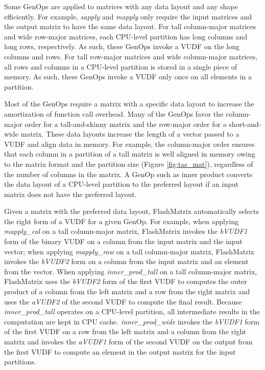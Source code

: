 Some GenOps are applied to matrices with any data layout and any shape
efficiently. For example, \textit{sapply} and \textit{mapply} only require
the input matrices and the output matrix to have the same data layout. For tall
column-major matrices and wide row-major matrices, each CPU-level partition has
long columns and long rows, respectively. As such, these GenOps invoke a VUDF
on the long columns and rows. For tall row-major matrices and wide column-major
matrices, all rows and columns in a CPU-level partition is stored in a single
piece of memory. As such, these GenOps invoke a VUDF only once on all
elements in a partition. %

Most of the GenOps require a matrix with
a specific data layout to increase the amortization of function call overhead.
Many of the GenOps favor the column-major order for a tall-and-skinny matrix
and the row-major order for a short-and-wide matrix. These data layouts increase
the length of a vector passed to a VUDF and align data in memory. For example,
the column-major order ensures that each column in a partition of a tall matrix
is well aligned in memory owing to the matrix format and the partition size
(Figure \ref{fig:tas_mat}), regardless of the number of columns in the matrix.
A GenOp
such as inner product converts the data layout of a CPU-level partition to
the preferred layout if an input matrix does not have the preferred layout.

Given a matrix with the preferred data layout, FlashMatrix automatically
selects the right form of a VUDF for a given GenOp. For example, when applying
\textit{mapply\_col} on a tall column-major matrix, FlashMatrix invokes
the \textit{bVUDF1} form of the binary VUDF on a column from the input matrix
and the input vector; when applying \textit{mapply\_row} on a tall column-major
matrix, FlashMatrix invokes the \textit{bVUDF2} form on a column from the input
matrix and an element from the vector. When applying \textit{inner\_prod\_tall}
on a tall column-major matrix, FlashMatrix uses the \textit{bVUDF2} form of
the first VUDF to computes the outer product of a column from the left matrix
and a row from the right matrix and uses the \textit{aVUDF2} of the second VUDF
to compute the final result. Because \textit{inner\_prod\_tall} operates on
a CPU-level partition, all intermediate results in the computation are kept
in CPU cache. \textit{inner\_prod\_wide} invokes the
\textit{bVUDF1} form of the first VUDF on a row from the left matrix and a column
from the right matrix and invokes the \textit{aVUDF1} form of the second VUDF
on the output from the first VUDF to compute an element in the output matrix for
the input partitions.

